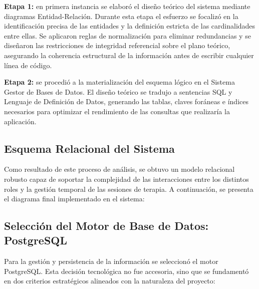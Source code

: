 \textbf{Etapa 1:} en primera instancia se elaboró el diseño teórico del sistema mediante diagramas Entidad-Relación. Durante esta etapa el esfuerzo se focalizó en la identificación precisa de las entidades y la definición estricta de las cardinalidades entre ellas. Se aplicaron reglas de normalización para eliminar redundancias y se diseñaron las restricciones de integridad referencial sobre el plano teórico, asegurando la coherencia estructural de la información antes de escribir cualquier línea de código.

\textbf{Etapa 2:} se procedió a la materialización del esquema lógico en el Sistema Gestor de Bases de Datos. El diseño teórico se tradujo a sentencias SQL y Lenguaje de Definición de Datos, generando las tablas, claves foráneas e índices necesarios para optimizar el rendimiento de las consultas que realizaría la aplicación.

\subsection{Esquema Relacional del Sistema}

Como resultado de este proceso de análisis, se obtuvo un modelo relacional robusto capaz de soportar la complejidad de las interacciones entre los distintos roles y la gestión temporal de las sesiones de terapia. A continuación, se presenta el diagrama final implementado en el sistema:


\subsection{Selección del Motor de Base de Datos: PostgreSQL}

Para la gestión y persistencia de la información se seleccionó el motor PostgreSQL. Esta decisión tecnológica no fue accesoria, sino que se fundamentó en dos criterios estratégicos alineados con la naturaleza del proyecto:

